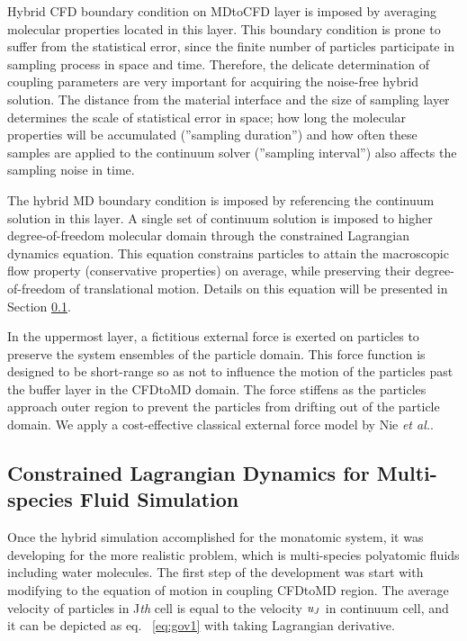 \documentclass[]{aiaa-tc}%
\begin{document}
Hybrid CFD boundary condition on MDtoCFD layer is imposed by averaging
molecular properties located in this layer. This boundary condition is prone to
suffer from the statistical error\cite{Hadjicon3,Time_Mechanism}, since
the finite number of particles participate in sampling process in space and time.
Therefore, the delicate determination of coupling parameters are very important
for acquiring the noise-free hybrid solution. The distance from the material 
interface and the size of sampling layer determines the scale of statistical 
error in space; how long the molecular properties will be accumulated
(''sampling duration'') and how often these samples are applied to the 
continuum solver (''sampling interval'') also affects the sampling noise in time.

The hybrid MD boundary condition is imposed by referencing the continuum solution
in this layer. A single set of continuum solution is imposed to higher
degree-of-freedom molecular domain through the constrained Lagrangian dynamics
equation. This equation constrains particles to attain the macroscopic flow property 
(conservative properties) on average, while preserving their degree-of-freedom of 
translational motion. Details on this equation will be presented in Section
\ref{sec:hybrid_multispecies}.

In the uppermost layer, a fictitious external force is exerted on particles 
to preserve the system ensembles of the particle domain. This force function
is designed to be short-range so as not to influence the motion of the particles 
past the buffer layer in the CFDtoMD domain. The force stiffens as the particles 
approach outer region to prevent the particles from drifting out of the 
particle domain. We apply a cost-effective classical external force model 
by Nie {\it{et al.}}\cite{Nie}. 


\subsection{Constrained Lagrangian Dynamics for Multi-species Fluid Simulation}
\label{sec:hybrid_multispecies}


Once the hybrid simulation accomplished for the monatomic system, it was developing for the more realistic problem, which is multi-species polyatomic fluids including water molecules.  The first step of the development was start with modifying to the equation of motion in coupling CFDtoMD region\cite{Nie}.  The average velocity of particles in J{\it{th}} cell is equal to the velocity $\it u_J$ in continuum cell, and it can be depicted as eq. ~\ref{eq:gov1} with taking Lagrangian derivative.
\end{document}
